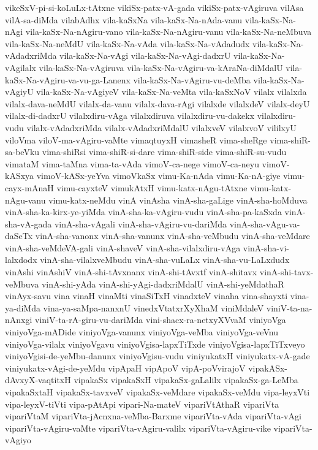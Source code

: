 {vikeSxV-pi-si-koLuLx-tAtxne
vikiSx-patx-vA-gada
vikiSx-patx-vAgiruva
vilAsa
vilA-sa-diMda
vilabAdhx
vila-kaSxNa
vila-kaSx-Na-nAda-vanu
vila-kaSx-Na-nAgi
vila-kaSx-Na-nAgiru-vano
vila-kaSx-Na-nAgiru-vanu
vila-kaSx-Na-neMbuva
vila-kaSx-Na-neMdU
vila-kaSx-Na-vAda
vila-kaSx-Na-vAdadudx
vila-kaSx-Na-vAdadxriMda
vila-kaSx-Na-vAgi
vila-kaSx-Na-vAgi-dadxrU
vila-kaSx-Na-vAgilalx
vila-kaSx-Na-vAgiruva
vila-kaSx-Na-vAgiru-va-kAraNa-diMdalU
vila-kaSx-Na-vAgiru-va-vu-ga-Lanenx
vila-kaSx-Na-vAgiru-vu-deMba
vila-kaSx-Na-vAgiyU
vila-kaSx-Na-vAgiyeV
vila-kaSx-Na-veMta
vila-kaSxNoV
vilalx
vilalxda
vilalx-dava-neMdU
vilalx-da-vanu
vilalx-dava-rAgi
vilalxde
vilalxdeV
vilalx-deyU
vilalx-di-dadxrU
vilalxdiru-vAga
vilalxdiruva
vilalxdiru-vu-dakekx
vilalxdiru-vudu
vilalx-vAdadxriMda
vilalx-vAdadxriMdalU
vilalxveV
vilalxvoV
vililxyU
viloVma
viloV-ma-vAgiru-vaMte
vimaqtuyxH
vimasheR
vima-sheRge
vima-shiR-sa-beVku
vima-shiRsi
vima-shiR-si-dare
vima-shiR-side
vima-shiR-su-vudu
vimataM
vima-taMna
vima-ta-vAda
vimoV-ca-nege
vimoV-ca-neyu
vimoV-kASxya
vimoV-kASx-yeYva
vimoVkaSx
vimu-Ka-nAda
vimu-Ka-nA-giye
vimu-cayx-mAnaH
vimu-cayxteV
vimukAtxH
vimu-katx-nAgu-tAtxne
vimu-katx-nAgu-vanu
vimu-katx-neMdu
vinA
vinAsha
vinA-sha-gaLige
vinA-sha-hoMduva
vinA-sha-ka-kirx-ye-yiMda
vinA-sha-ka-vAgiru-vudu
vinA-sha-pa-kaSxda
vinA-sha-vA-gada
vinA-sha-vAgali
vinA-sha-vAgiru-vu-dariMda
vinA-sha-vAgu-va-daSeTx
vinA-sha-vanonx
vinA-sha-vanunx
vinA-sha-veMbudu
vinA-sha-veMdare
vinA-sha-veMdeVA-gali
vinA-shaveV
vinA-sha-vilalxdiru-vAga
vinA-sha-vi-lalxdodx
vinA-sha-vilalxveMbudu
vinA-sha-vuLaLx
vinA-sha-vu-LaLxdudx
vinAshi
vinAshiV
vinA-shi-tAvxnanx
vinA-shi-tAvxtf
vinA-shitavx
vinA-shi-tavx-veMbuva
vinA-shi-yAda
vinA-shi-yAgi-dadxriMdalU
vinA-shi-yeMdathaR
vinAyx-savu
vina
vinaH
vinaMti
vinaSiTxH
vinadxteV
vinaha
vina-shayxti
vina-ya-diMda
vina-ya-saMpa-nanxnU
vinedxVtatxrXyXhaM
viniMdaleV
viniV-ta-na-nAnxgi
viniV-ta-rA-giru-vu-dariMda
vini-shacx-ra-netxyXVvaM
viniyoVga
viniyoVga-mADide
viniyoVga-vanunx
viniyoVga-veMba
viniyoVga-veVnu
viniyoVga-vilalx
viniyoVgavu
viniyoVgisa-lapxTiTxde
viniyoVgisa-lapxTiTxveyo
viniyoVgisi-de-yeMbu-danunx
viniyoVgisu-vudu
viniyukatxH
viniyukatx-vA-gade
viniyukatx-vAgi-de-yeMdu
vipApaH
vipApoV
vipA-poVvirajoV
vipakASx-dAvxyX-vaqtitxH
vipakaSx
vipakaSxH
vipakaSx-gaLalilx
vipakaSx-ga-LeMba
vipakaSxtaH
vipakaSx-tavxveV
vipakaSx-veMdare
vipakaSx-veMdu
vipa-leyxVti
vipa-leyxV-tiVti
vipa-pAtApi
vipari-Na-mateV
vipariVtAthaR
vipariVta
vipariVtaM
vipariVta-jAcnxna-veMba-Barxme
vipariVta-vAda
vipariVta-vAgi
vipariVta-vAgiru-vaMte
vipariVta-vAgiru-valilx
vipariVta-vAgiru-vike
vipariVta-vAgiyo
}
